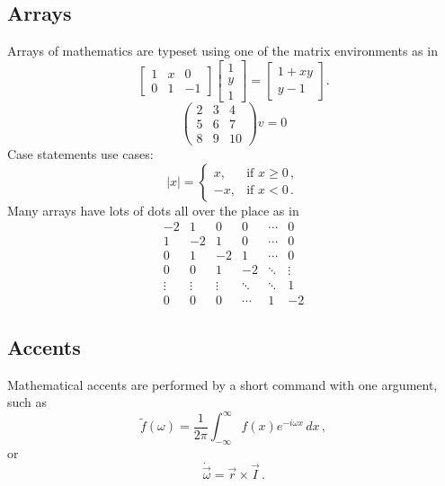 \subsection{Arrays}
Arrays of mathematics are typeset using one of the matrix environments as
in
\[
        \begin{bmatrix}
                1 & x & 0 \\
                0 & 1 & -1
        \end{bmatrix}\begin{bmatrix}
                1  \\
                y  \\
                1
        \end{bmatrix}
        =\begin{bmatrix}
                1+xy  \\
                y-1
        \end{bmatrix}.
\]
\[   
\begin{pmatrix}
2 & 3 & 4\\
5 & 6 & 7\\
8 & 9 & 10 \end{pmatrix} v = 0 \]
Case statements use cases:
\[
        |x|=\begin{cases}
                x, & \text{if }x\geq 0\,,  \\
                -x, & \text{if }x< 0\,.
        \end{cases}
\]
Many arrays have lots of dots all over the place as in
\[
        \begin{matrix}
                -2 & 1 & 0 & 0 & \cdots & 0  \\
                1 & -2 & 1 & 0 & \cdots & 0  \\
                0 & 1 & -2 & 1 & \cdots & 0  \\
                0 & 0 & 1 & -2 & \ddots & \vdots \\
                \vdots & \vdots & \vdots & \ddots & \ddots & 1  \\
                0 & 0 & 0 & \cdots & 1 & -2
        \end{matrix}
\]

\subsection{Accents}
Mathematical accents are performed by a short command with one
argument, such as
\[
        \tilde f(\omega)=\frac{1}{2\pi}
        \int_{-\infty}^\infty f(x)e^{-i\omega x}\,dx\,,
\]
or
\[
        \dot{\vec \omega}=\vec r\times\vec I\,.
\]
